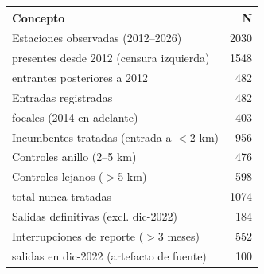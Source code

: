 \begin{tabular}{lr}
\toprule
Concepto & N \\
\midrule
Estaciones observadas (2012–2026) & 2030 \\
\quad presentes desde 2012 (censura izquierda) & 1548 \\
\quad entrantes posteriores a 2012 &  482 \\
Entradas registradas &  482 \\
\quad focales (2014 en adelante) &  403 \\
Incumbentes tratadas (entrada a $<$2 km) &  956 \\
Controles anillo (2--5 km) &  476 \\
Controles lejanos ($>$5 km) &  598 \\
\quad total nunca tratadas & 1074 \\
Salidas definitivas (excl. dic-2022) &  184 \\
Interrupciones de reporte ($>$3 meses) &  552 \\
\quad salidas en dic-2022 (artefacto de fuente) &  100 \\
\bottomrule
\end{tabular}
